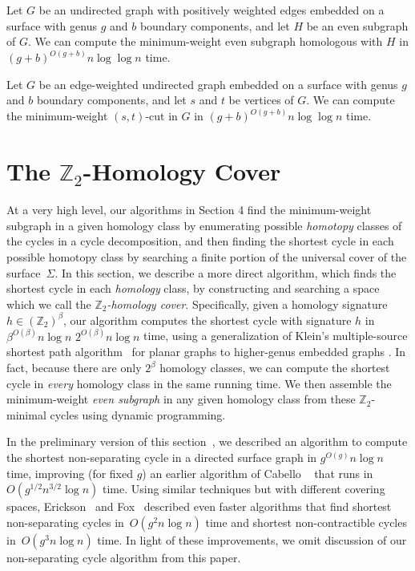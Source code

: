 \documentclass[letterpaper,review]{siamart190516}
\def\Z{\mathbb{Z}}
\def\modified#1{\color{blue}#1 \color{black}}
\begin{document}
\begin{theorem}
\label{Th:Z2-minimal-crossing}
Let $G$ be an undirected graph with positively weighted edges embedded on a surface with genus $g$ and $b$ boundary components, and let $H$ be an even subgraph of $G$. We can compute the minimum-weight even subgraph homologous with $H$ in $(g+b)^{O(g+b)} n\log \log n$ time.
\end{theorem}

\begin{corollary}
\label{C:min-cut-crossing}
Let $G$ be an edge-weighted undirected graph embedded on a surface with genus $g$ and $b$ boundary components, and let $s$ and $t$ be vertices of $G$.  We can compute the minimum-weight $(s,t)$-cut in $G$ in $(g+b)^{O(g+b)} n\log \log n$ time.
\end{corollary}

\section{The $\Z_2$-Homology Cover}
\label{sec:homcover}

At a very high level, our algorithms in Section 4 find the minimum-weight subgraph in a given homology class by enumerating possible \emph{homotopy} classes of the cycles in a cycle decomposition, and then finding the shortest cycle in each possible homotopy class by searching a finite portion of the universal cover of the surface~$\Sigma$.  In this section, we describe a more direct algorithm, which finds the shortest cycle in each \emph{homology} class, by constructing and searching a space which we call the \emph{$\Z_2$-homology cover}.
Specifically, given a homology signature $h\in (\Z_2)^\beta$, our algorithm computes the shortest
cycle with signature $h$ in \sout{$\beta^{O(\beta)} n \log n$} \modified{$2^{O(\beta)} n \log n$} time, using a generalization of Klein's
multiple-source shortest path algorithm~\cite{k-msspp-05} for planar graphs to higher-genus embedded
graphs \cite{cce-msspe-13,efl-hmcpf-18}.
In fact, because there are only $2^\beta$ homology classes, we can compute the shortest cycle in \emph{every} homology class in the same running time.
We then assemble the minimum-weight \emph{even subgraph} in any given homology class from these $\Z_2$-minimal cycles using dynamic programming.

In the preliminary version of this section~\cite{en-mcsnc-11}, we described an algorithm to compute
the shortest non-separating cycle in a directed surface graph in $g^{O(g)} n \log n$ time, improving
(for fixed $g$) an earlier algorithm of Cabello \etal~\cite{ccl-fsncd-10} that runs in
$O(g^{1/2}n^{3/2}\log n)$ time.  Using similar techniques but with different covering spaces,
Erickson~\cite{e-sncds-11} and Fox~\cite{f-sntcd-13} described even faster algorithms that find
shortest non-separating cycles in~$O(g^2 n \log n)$ time and shortest non-contractible cycles
in~$O(g^3 n \log n)$ time.  In light of these improvements, we omit discussion of our non-separating
cycle algorithm from this paper.
\end{document}
